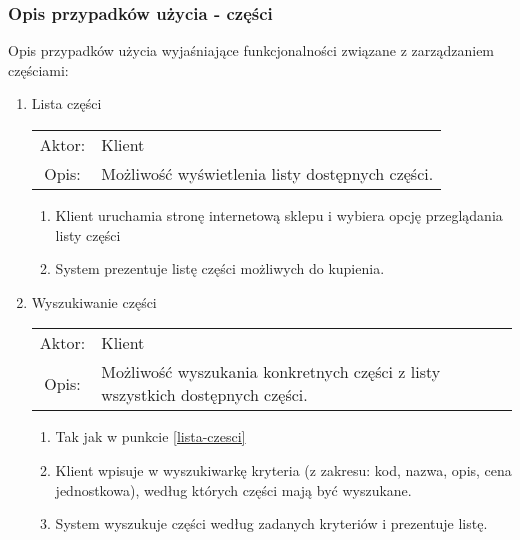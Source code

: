 \subsubsection{Opis przypadków użycia - części}

Opis przypadków użycia wyjaśniające funkcjonalności związane z zarządzaniem
częściami:

\begin{enumerate}
  \item Lista części \label{lista-czesci} \\
  \begin{tabularx}{\linewidth}{ c X }
  Aktor: & Klient \\
  Opis: & Możliwość wyświetlenia listy dostępnych części.\\
  \end{tabularx}
   \begin{enumerate}
    \item Klient uruchamia stronę internetową sklepu i wybiera opcję przeglądania listy części
    \item System prezentuje listę części możliwych do kupienia.
  \end{enumerate}
  
  \item Wyszukiwanie części \label{wyszukiwanie-czesci} \\
  \begin{tabularx}{\linewidth}{ c X }
  Aktor: & Klient \\
  Opis: & Możliwość wyszukania konkretnych części z listy wszystkich dostępnych części.\\
  \end{tabularx}
   \begin{enumerate}
    \item Tak jak w punkcie \ref{lista-czesci}
    \item Klient wpisuje w wyszukiwarkę kryteria (z zakresu: kod, nazwa, opis, cena jednostkowa), według których części mają być wyszukane.
    \item System wyszukuje części według zadanych kryteriów i prezentuje listę.
  \end{enumerate}
  

\end{enumerate}

